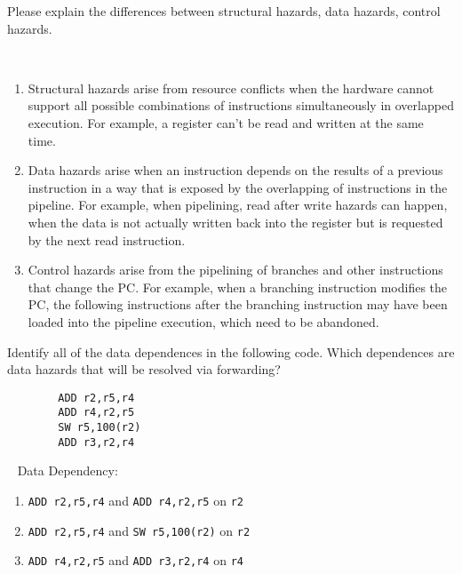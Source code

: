 \begin{exercise}[]{
    Please explain the differences between structural hazards, data hazards, control hazards.
    }
  \begin{solution}
  \par{~}
  \begin{enumerate}
      \item Structural hazards arise from resource conflicts when the hardware cannot support all possible combinations of instructions simultaneously in overlapped execution. For example, a register can't be read and written at the same time.
      \item Data hazards arise when an instruction depends on the results of a previous instruction in a way that is exposed by the overlapping of instructions in the pipeline. For example, when pipelining, read after write hazards can happen, when the data is not actually written back into the register but is requested by the next read instruction.
      \item Control hazards arise from the pipelining of branches and other instructions that change the PC. For example, when a branching instruction modifies the PC, the following instructions after the branching instruction may have been loaded into the pipeline execution, which need to be abandoned.
  \end{enumerate}
  \end{solution}
  \label{ex1}
\end{exercise}


\begin{exercise}[]{Identify all of the data dependences in the following code. Which dependences are data hazards that will be resolved via forwarding?}
    \begin{verbatim}
        ADD r2,r5,r4
        ADD r4,r2,r5
        SW r5,100(r2)
        ADD r3,r2,r4 
    \end{verbatim}
  \begin{solution}
  \par{~}
  Data Dependency:
  \begin{enumerate}
      \item \texttt{ADD r2,r5,r4} and \texttt{ADD r4,r2,r5} on \texttt{r2}
      \item \texttt{ADD r2,r5,r4} and \texttt{SW r5,100(r2)} on \texttt{r2}
      \item \texttt{ADD r4,r2,r5} and \texttt{ADD r3,r2,r4} on \texttt{r4}
  \end{enumerate}
  

  \end{solution}
  \label{ex2}
\end{exercise}

